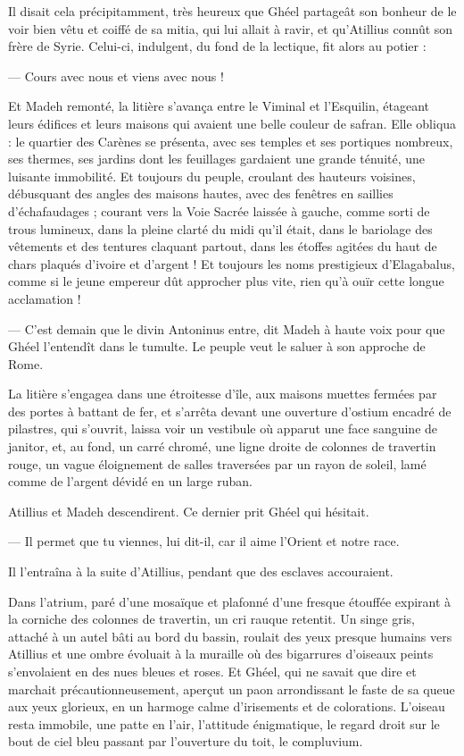 \documentclass[a4paper, 11pt, oneside, polutonikogreek, french]{article}
\begin{document}
Il disait cela précipitamment, très heureux que Ghéel partageât son bonheur de le voir bien vêtu et coiffé de sa mitia, qui lui allait à ravir, et qu'Atillius connût son frère de Syrie. Celui-ci, indulgent, du fond de la lectique, fit alors au potier :

--- Cours avec nous et viens avec nous !

Et Madeh remonté, la litière s'avança entre le Viminal et l'Esquilin, étageant leurs édifices et leurs maisons qui avaient une belle couleur de safran. Elle obliqua : le quartier des Carènes se présenta, avec ses temples et ses portiques nombreux, ses thermes, ses jardins dont les feuillages gardaient une grande ténuité, une luisante immobilité. Et toujours du peuple, croulant des hauteurs voisines, débusquant des angles des maisons hautes, avec des fenêtres en saillies d'échafaudages ; courant vers la Voie Sacrée laissée à gauche, comme sorti de trous lumineux, dans la pleine clarté du midi qu'il était, dans le bariolage des vêtements et des tentures claquant partout, dans les étoffes agitées du haut de chars plaqués d'ivoire et d'argent ! Et toujours les noms prestigieux d'Elagabalus, comme si le jeune empereur dût approcher plus vite, rien qu'à ouïr cette longue acclamation !

--- C'est demain que le divin Antoninus entre, dit Madeh à haute voix pour que Ghéel l'entendît dans le tumulte. Le peuple veut le saluer à son approche de Rome.

La litière s'engagea dans une étroitesse d'île, aux maisons muettes fermées par des portes à battant de fer, et s'arrêta devant une ouverture d'ostium encadré de pilastres, qui s'ouvrit, laissa voir un vestibule où apparut une face sanguine de janitor, et, au fond, un carré chromé, une ligne droite de colonnes de travertin rouge, un vague éloignement de salles traversées par un rayon de soleil, lamé comme de l'argent dévidé en un large ruban.

Atillius et Madeh descendirent. Ce dernier prit Ghéel qui hésitait.

--- Il permet que tu viennes, lui dit-il, car il aime l'Orient et notre race.

Il l'entraîna à la suite d'Atillius, pendant que des esclaves accouraient.

Dans l'atrium, paré d'une mosaïque et plafonné d'une fresque étouffée expirant à la corniche des colonnes de travertin, un cri rauque retentit. Un singe gris, attaché à un autel bâti au bord du bassin, roulait des yeux presque humains vers Atillius et une ombre évoluait à la muraille où des bigarrures d'oiseaux peints s'envolaient en des nues bleues et roses. Et Ghéel, qui ne savait que dire et marchait précautionneusement, aperçut un paon arrondissant le faste de sa queue aux yeux glorieux, en un harmoge calme d'irisements et de colorations. L'oiseau resta immobile, une patte en l'air, l'attitude énigmatique, le regard droit sur le bout de ciel bleu passant par l'ouverture du toit, le compluvium.
\end{document}
